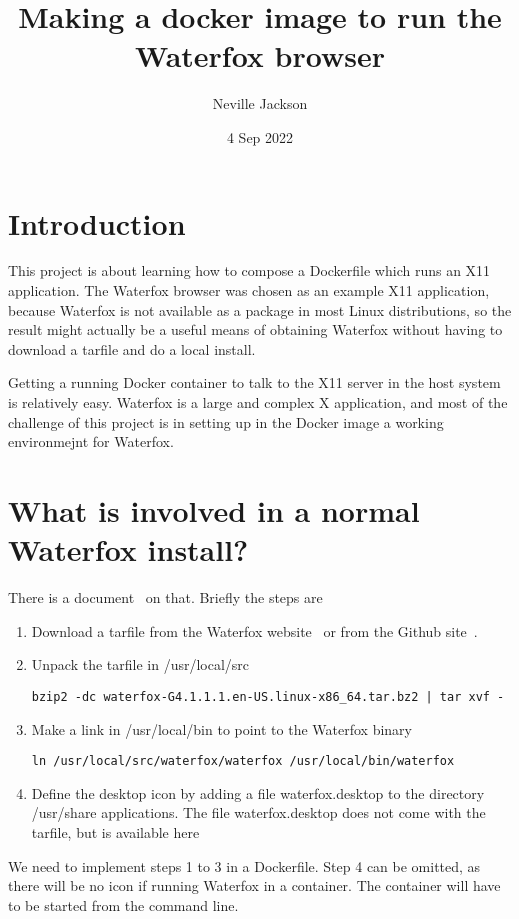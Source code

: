 \documentclass{article}  %
\title{Making a docker image to run the Waterfox browser}
\author{Neville Jackson}
\date{4 Sep 2022}
\begin{document}
 

\maketitle      
\tableofcontents

\section{Introduction} 
This project is about learning how to compose a Dockerfile which runs an X11 application. The Waterfox browser was chosen as an example X11 application, because Waterfox is not available as a package in most Linux distributions, so the result might actually be a useful means of obtaining Waterfox without having to download a tarfile and do a local install. 

Getting a running Docker container to talk to the X11 server in the host system is relatively easy. Waterfox is a large and complex X application, and most of the challenge of this project is in setting up in the Docker image a working environmejnt for Waterfox. 

\section{What is involved in a normal Waterfox install?}
There is a document~\cite{wate:22a} on that.  Briefly the steps are
\begin{enumerate}
\item Download a tarfile from the Waterfox website~\cite{wate:22} or from the Github site~\cite{wate:22b}.
\item  Unpack the tarfile in /usr/local/src
\begin{verbatim}
bzip2 -dc waterfox-G4.1.1.1.en-US.linux-x86_64.tar.bz2 | tar xvf -
\end{verbatim}
\item Make a link in /usr/local/bin to point to the Waterfox binary
\begin{verbatim}
ln /usr/local/src/waterfox/waterfox /usr/local/bin/waterfox
\end{verbatim}
\item Define the desktop icon by adding a file waterfox.desktop to the directory /usr/share applications. The file waterfox.desktop does not come with the tarfile, but is available here~\cite{wate:22a}
\end{enumerate}
We need to implement steps 1 to 3 in a Dockerfile. Step 4 can be omitted, as there will be no icon if running Waterfox in a container. The container will have to be started from the command line.
\end{document}
